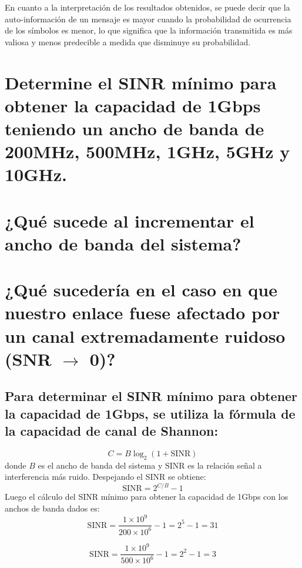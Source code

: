 \documentclass[
  11pt,
  letterpaper,
  answers
]{exam}
\begin{document}
\begin{questions}
\begin{solution}
\begin{parts}
En cuanto a la interpretación de los resultados obtenidos, se puede decir que la auto-información de un mensaje es mayor cuando la probabilidad de ocurrencia de los símbolos es menor, lo que significa que la información transmitida es más valiosa y menos predecible a medida que disminuye su probabilidad.
\end{parts}
\end{solution}


\begin{parts}
    \part{Determine el SINR mínimo para obtener la capacidad de 1Gbps teniendo un ancho de banda de 200MHz, 500MHz, 1GHz, 5GHz y 10GHz.}
    \part{¿Qué sucede al incrementar el ancho de banda del sistema?}
    \part{¿Qué sucedería en el caso en que nuestro enlace fuese afectado por un canal extremadamente ruidoso (SNR \(\to\) 0)?}
\end{parts}

\begin{solution}
\begin{parts}
\part{Para determinar el SINR mínimo para obtener la capacidad de 1Gbps, se utiliza la fórmula de la capacidad de canal de Shannon:}
\[
C = B \log_2 (1 + \text{SINR})
\]
donde \( B \) es el ancho de banda del sistema y \( \text{SINR} \) es la relación señal a interferencia más ruido. Despejando el SINR se obtiene:
\[
\text{SINR} = 2^{C/B} - 1
\]
Luego el cálculo del SINR mínimo para obtener la capacidad de 1Gbps con los anchos de banda dados es:	
\[
\text{SINR} = \frac{1 \times 10^9}{200 \times 10^6} - 1 = 2^5 - 1 = 31
\]

\[
\text{SINR} = \frac{1 \times 10^9}{500 \times 10^6} - 1 = 2^2 - 1 = 3
\]


\end{parts}
\end{solution}
\end{questions}
\end{document}
